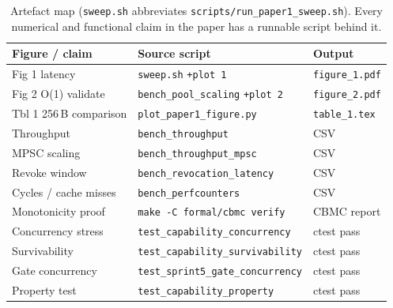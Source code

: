 \begin{table}[t]
\centering\scriptsize
\setlength{\tabcolsep}{2pt}
\begin{tabular}{lll}
\toprule
Figure / claim         & Source script         & Output \\
\midrule
Fig 1 latency          & \texttt{sweep.sh} \tiny\texttt{+plot 1} & \texttt{figure\_1.pdf} \\
Fig 2 O(1) validate    & \texttt{bench\_pool\_scaling}    \tiny\texttt{+plot 2} & \texttt{figure\_2.pdf} \\
Tbl 1 256\,B comparison & \texttt{plot\_paper1\_figure.py}                       & \texttt{table\_1.tex}  \\
Throughput             & \texttt{bench\_throughput}                              & CSV                          \\
MPSC scaling           & \texttt{bench\_throughput\_mpsc}                        & CSV                          \\
Revoke window          & \texttt{bench\_revocation\_latency}                     & CSV                          \\
Cycles / cache misses  & \texttt{bench\_perfcounters}                            & CSV                          \\
Monotonicity proof     & \texttt{make -C formal/cbmc verify}                     & CBMC report                  \\
Concurrency stress     & \texttt{test\_capability\_concurrency}                  & ctest pass                   \\
Survivability          & \texttt{test\_capability\_survivability}                & ctest pass                   \\
Gate concurrency       & \texttt{test\_sprint5\_gate\_concurrency}               & ctest pass                   \\
Property test          & \texttt{test\_capability\_property}                     & ctest pass                   \\
\bottomrule
\end{tabular}
\caption{Artefact map (\texttt{sweep.sh} abbreviates
\texttt{scripts/run\_paper1\_sweep.sh}). Every numerical and
functional claim in the paper has a runnable script behind it.}
\label{tab:artefact}
\end{table}

